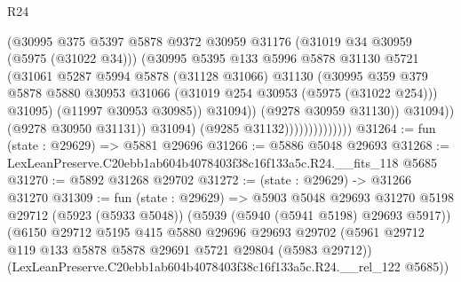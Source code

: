 \begin{lexlean}{R24}
\begin{coremodule}
                                        (@30995
                                          @375
                                          @5397
                                          @5878
                                          @9372
                                          @30959
                                          @31176
                                          (@31019 @34 @30959 (@5975 (@31022 @34)))
                                          (@30995
                                            @5395
                                            @133
                                            @5996
                                            @5878
                                            @31130
                                            @5721
                                            (@31061
                                              @5287
                                              @5994
                                              @5878
                                              (@31128 @31066)
                                              @31130
                                              (@30995
                                                @359
                                                @379
                                                @5878
                                                @5880
                                                @30953
                                                @31066
                                                (@31019 @254 @30953 (@5975 (@31022 @254)))
                                                @31095)
                                              (@11997 @30953 @30985))
                                            @31094))
                                        (@9278 @30959 @31130))
                                      @31094))
                                  (@9278 @30950 @31131))
                                @31094)
                              (@9285 @31132))))))))))))))
@31264 := fun (state : @29629) => @5881 @29696
@31266 := @5886 @5048 @29693
@31268 := LexLeanPreserve.C20ebb1ab604b4078403f38c16f133a5c.R24.__fits_118 @5685
@31270 := @5892 @31268 @29702
@31272 := (state : @29629) -> @31266 @31270
@31309 := fun (state : @29629) =>
  @5903
    @5048
    @29693
    @31270
    @5198
    @29712
    (@5923 (@5933 @5048))
    (@5939 (@5940 (@5941 @5198) @29693 @5917))
    (@6150
      @29712
      @5195
      @415
      @5880
      @29696
      @29693
      @29702
      (@5961 @29712 @119 @133 @5878 @5878 @29691 @5721 @29804 (@5983 @29712))
      (LexLeanPreserve.C20ebb1ab604b4078403f38c16f133a5c.R24.__rel_122 @5685))

\end{coremodule}
\end{lexlean}

